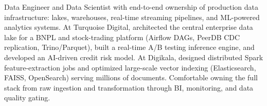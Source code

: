 \small{Data Engineer and Data Scientist with end-to-end ownership of production data infrastructure: lakes, warehouses, real-time streaming pipelines, and ML-powered analytics systems. At Turquoise Digital, architected the central enterprise data lake for a BNPL and stock-trading platform (Airflow DAGs, PeerDB CDC replication, Trino/Parquet), built a real-time A/B testing inference engine, and developed an AI-driven credit risk model. At Digikala, designed distributed Spark feature-extraction jobs and optimized large-scale vector indexing (Elasticsearch, FAISS, OpenSearch) serving millions of documents. Comfortable owning the full stack from raw ingestion and transformation through BI, monitoring, and data quality gating.}\vspace{4pt}
